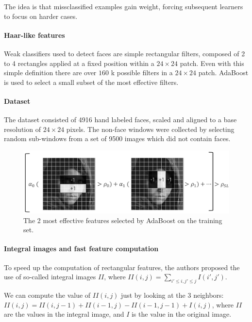 The idea is that missclassified examples gain weight, forcing subsequent learners to focus on harder cases.

\paragraph{Haar-like features}
Weak classifiers used to detect faces are simple rectangular filters, composed of 2 to 4 rectangles applied at a fixed position within a $24 \times 24$ patch.
Even with this simple definition there are over $160$ k possible filters in a $24 \times 24$ patch.
AdaBoost is used to select a small subset of the most effective filters.

\paragraph{Dataset}
The dataset consisted of 4916 hand labeled faces, scaled and aligned to a base resolution of $24 \times 24$ pixels.
The non-face windows were collected by selecting random sub-windows from a set of 9500 images which did not contain faces.

\begin{figure}[htbp]
  \centering
  \includegraphics[width=0.6\linewidth]{./img/adaboost.png}
  \caption{The 2 most effective features selected by AdaBoost on the training set.}
\end{figure}

\paragraph{Integral images and fast feature computation}
To speed up the computation of rectangular features, the authors proposed the use of so-called integral images $II$, where $II(i,j) = \sum_{i' \leq i, j' \leq j} I(i', j')$.

We can compute the value of $II(i,j)$ just by looking at the 3 neighbors: $II(i,j) = II(i, j-1) + II(i-1, j) - II(i-1, j-1) + I(i,j)$, where $II$ are the values in the integral image, and $I$ is the value in the original image.

